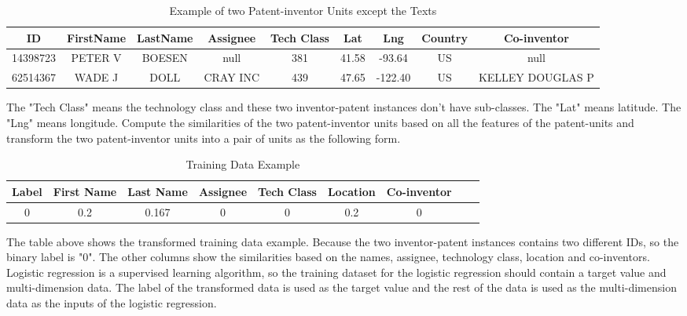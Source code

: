 \begin{table}[htb]
\scriptsize
\begin{center}
\begin{tabular}{ | c | c | c | c | c | c | c | c | c |}


\hline
  ID  & FirstName & LastName & Assignee & Tech Class & Lat & Lng & Country & Co-inventor \\ \hline
    14398723 &PETER V & BOESEN & null &  381 & 41.58 & -93.64 & US & null \\ \hline
    62514367 &WADE J& DOLL& CRAY INC & 439 &  47.65 & -122.40 & US & KELLEY DOUGLAS P \\
  \hline
\end{tabular}
\end{center}
\caption{Example of two Patent-inventor Units except the Texts}
\end{table}
 The "Tech Class" means the technology class and these two inventor-patent instances don't have sub-classes. The "Lat" means latitude. The "Lng" means longitude. Compute the similarities of the two patent-inventor units based on all the features of the patent-units and transform the two patent-inventor units into a pair of units  as the following form.
\begin{table}[htb]
\scriptsize
\begin{center}
\begin{tabular}{ | c | c | c | c | c | c | c | c | c |}
\hline
  Label  & First Name & Last Name & Assignee & Tech Class & Location & Co-inventor \\ \hline
   0 &0.2 & 0.167 & 0 &  0 & 0.2 & 0 \\ 
   \hline
\end{tabular}
\end{center} 
\caption{Training Data Example}
\end{table}
The table above shows the transformed training data example. Because the two inventor-patent instances contains two different IDs, so the binary label is "0". The other columns show the similarities based on the names, assignee, technology class, location and co-inventors. Logistic regression is a supervised learning algorithm, so the training dataset for the logistic regression should contain a target value and multi-dimension data. The label of the transformed data is used as the target value and the rest of the data is used as the multi-dimension data as the inputs of the logistic regression. 
\\

